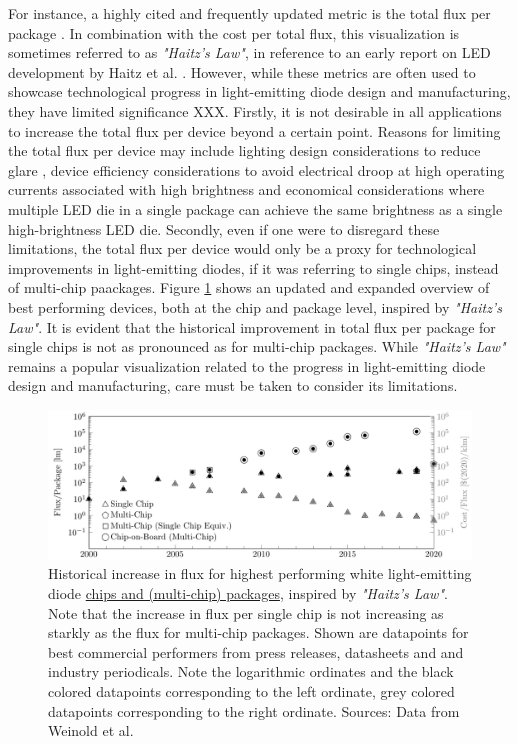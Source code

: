 \documentclass[a4paper,nocompress]{spie}  %
\begin{document}
For instance, a highly cited and frequently updated metric is the total flux per package \cite{Liu2009}\cite{haitz2011solid}\cite{cho2017white}\cite{Fontoynont2018}. In combination with the cost per total flux, this visualization is sometimes referred to as \textit{"Haitz's Law"}, in reference to an early report on LED development by Haitz et al. \cite{haitz1999case}. However, while these metrics are often used to showcase technological progress in light-emitting diode design and manufacturing, they have limited significance XXX. Firstly, it is not desirable in all applications to increase the total flux per device beyond a certain point. Reasons for limiting the total flux per device may include lighting design considerations to reduce glare \cite{khan2015led}, device efficiency considerations to avoid electrical droop at high operating currents associated with high brightness \cite{Piprek2010} and economical considerations where multiple LED die in a single package can achieve the same brightness as a single high-brightness LED die. Secondly, even if one were to disregard these limitations, the total flux per device would only be a proxy for technological improvements in light-emitting diodes, if it was referring to single chips, instead of multi-chip paackages. 
Figure \ref{fig:haitz} shows an updated and expanded overview of best performing devices, both at the chip and package level, inspired by \textit{"Haitz's Law"}. It is evident that the historical improvement in total flux per package for single chips is not as pronounced as for multi-chip packages. While \textit{"Haitz's Law"} remains a popular visualization related to the progress in light-emitting diode design and manufacturing, care must be taken to consider its limitations.

\begin{figure} [ht]
    \begin{center}
        \includegraphics[width=\textwidth]{haitz_law_white.pdf}
    \end{center}
    \caption{Historical increase in flux for highest performing white light-emitting diode \underline{chips and (multi-chip) packages}, inspired by \textit{"Haitz's Law"}. Note that the increase in flux per single chip is not increasing as starkly as the flux for multi-chip packages. Shown are datapoints for best commercial performers from press releases, datasheets and and industry periodicals. Note the logarithmic ordinates and the black colored datapoints corresponding to the left ordinate, grey colored datapoints corresponding to the right ordinate. Sources: Data from Weinold et al. \cite{weinold2020technology}}
    \label{fig:haitz}
\end{figure}
\end{document}
